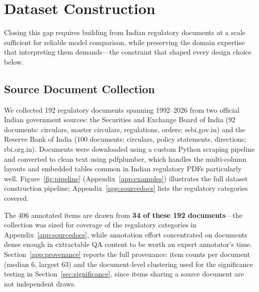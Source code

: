 
\section{Dataset Construction}

Closing this gap requires building from Indian regulatory documents at a scale sufficient for
reliable model comparison, while preserving the domain expertise that interpreting them
demands---the constraint that shaped every design choice below.

\subsection{Source Document Collection}

We collected 192 regulatory documents spanning 1992--2026 from two official Indian government
sources: the Securities and Exchange Board of India (92 documents: circulars, master circulars,
regulations, orders; sebi.gov.in) and the Reserve Bank of India (100 documents: circulars, policy
statements, directions; rbi.org.in). Documents were downloaded using a custom Python scraping
pipeline and converted to clean text using pdfplumber, which handles the multi-column layouts and
embedded tables common in Indian regulatory PDFs particularly well. Figure~\ref{fig:pipeline}
(Appendix~\ref{app:examples}) illustrates the full dataset construction pipeline;
Appendix~\ref{app:sourcedocs} lists the regulatory categories covered.

The 406 annotated items are drawn from \textbf{34 of these 192 documents}---the collection was
sized for coverage of the regulatory categories in Appendix~\ref{app:sourcedocs}, while annotation
effort concentrated on documents dense enough in extractable QA content to be worth an expert
annotator's time. Section~\ref{app:provenance} reports the full provenance: item counts per
document (median 6, largest 63) and the document-level clustering used for the significance testing
in Section~\ref{sec:significance}, since items sharing a source document are not independent draws.

